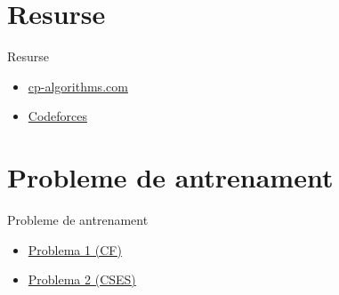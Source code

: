 \documentclass[10pt]{beamer}
\begin{document}
\section{Resurse}

\begin{frame}{Resurse}
  \begin{itemize}
    \item \href{https://cp-algorithms.com}{cp-algorithms.com}
    \item \href{https://codeforces.com}{Codeforces}
  \end{itemize}
\end{frame}

\section{Probleme de antrenament}

\begin{frame}{Probleme de antrenament}
  \begin{itemize}
    \item \href{https://codeforces.com/problemset}{Problema 1 (CF)}
    \item \href{https://cses.fi/problemset}{Problema 2 (CSES)}
  \end{itemize}
\end{frame}
\end{document}
